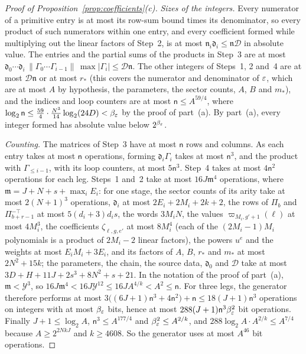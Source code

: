 \begin{proof}[Proof of Proposition~\ref{prop:coefficients}(c)]
\emph{Sizes of the integers.} Every numerator of a primitive entry is at
most its row-sum bound times its denominator, so every product of such
numerators within one entry, and every coefficient formed while
multiplying out the linear factors of Step~2, is at most
\(\mathfrak n_i\mathfrak d_i\le\mathfrak n\mathcal D\) in absolute value.
The entries and the partial sums of the products in Step~3 are at most
\(\mathfrak d_0\cdots\mathfrak d_i\,\|\Gamma_0\cdots\Gamma_{i-1}\|\,
\max|\Gamma_i|\le\mathcal D\mathfrak n\). The other integers of Steps~1,
2 and~4 are at most \(\mathcal D\mathfrak n\) or at most \(r_*\) (this
covers the numerator and denominator of \(\varepsilon\), which are at most \(A\)
by hypothesis, the parameters, the sector counts, \(A\), \(B\) and
\(m_*\)), and the indices and loop counters are at most
\(\mathsf n\le A^{59/4}\), where
\(\log_2\mathsf n\le\frac{59}4\cdot\frac{N^3}{14}\log_2(24D)<\beta_\varepsilon\)
by the proof of part~(a). By part~(a), every integer formed has absolute
value below \(2^{\beta_\varepsilon}\).

\emph{Counting.} The matrices of Step~3 have at most \(\mathsf n\) rows
and columns. As each entry takes at most \(\mathsf n\) operations,
forming \(\mathfrak d_i\Gamma_i\) takes at most \(\mathsf n^3\), and
the product with \(\Gamma_{\le i-1}\), with its loop counters, at most
\(5\mathsf n^3\). Step~4 takes at most \(4\mathsf n^2\) operations for each
leg. Steps~1 and~2 take at most
\(16J\mathfrak m^4\) operations, where
\(\mathfrak m=J+N+s+\max_iE_i\): for one stage, the sector counts of its
arity take at most \(2(N+1)^3\) operations, \(\mathfrak d_i\) at most
\(2E_i+2M_i+2k+2\), the rows of \(\Pi_b\) and \(\Pi_{b+r-1}^{-\top}\) at
most \(5(d_i+3)d_is\), the words \(3M_iN\), the values
\(\varpi_{M_i,g'+1}(\ell)\) at most \(4M_i^3\), the coefficients
\(\zeta_{\ell,g,e'}\) at most \(8M_i^4\) (each of the \((2M_i-1)M_i\)
polynomials is a product of \(2M_i-2\) linear factors), the powers
\(u^e\) and the weights at most \(E_iM_i+3E_i\), and its factors of \(A\),
\(B\), \(r_*\) and \(m_*\) at most \(2N^2+15k\); the parameters, the
chain, the source data, \(\mathfrak d_0\) and \(\mathcal D\) take at most
\(3D+H+11J+2s^3+8N^2+s+21\). In the notation of the proof of part~(a),
\(\mathfrak m<\mathcal Y^3\), so
\(16J\mathfrak m^4<16J\mathcal Y^{12}\le16JA^{4/k}<A^2\le\mathsf n\).
For three legs, the generator therefore performs at most
\(3\bigl((6J+1)\mathsf n^3+4\mathsf n^2\bigr)+\mathsf n\le18(J+1)\mathsf n^3\)
operations on integers with at most \(\beta_\varepsilon\) bits, hence at most
\(288(J+1)\mathsf n^3\beta_\varepsilon^2\) bit operations. Finally
\(J+1\le\log_2A\), \(\mathsf n^3\le A^{177/4}\) and
\(\beta_\varepsilon^2\le A^{2/k}\), and \(288\log_2A\cdot A^{2/k}\le A^{7/4}\)
because \(A\ge2^{2NkJ}\) and \(k\ge4608\). So the generator uses at most
\(A^{46}\) bit operations.
\end{proof}
